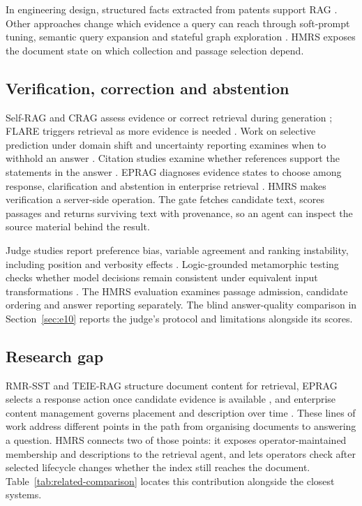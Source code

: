 In engineering design, structured facts extracted from patents support RAG
\citep{siddharth2024retrieval}. Other approaches change which evidence a
query can reach through soft-prompt tuning, semantic query expansion and
stateful graph exploration
\citep{peng2024soft,massai2023evaluatio,tao2025fine}. HMRS exposes the document
state on which collection and passage selection depend.

\subsection{Verification, correction and abstention}

Self-RAG and CRAG assess evidence or correct retrieval during generation
\citep{selfrag,crag}; FLARE triggers retrieval as more evidence is needed
\citep{flare}. Work on selective prediction under domain shift and
uncertainty reporting examines when to withhold an answer
\citep{kamath,feng-abstain,yin-knowwhat}. Citation studies examine whether
references support the statements in the answer
\citep{liu-verifiability,gao-citations}.
EPRAG diagnoses evidence states to choose among response, clarification and
abstention in enterprise retrieval \citep{kinalioglu-kbs-eprag-2026}.
HMRS makes verification a server-side operation. The gate fetches
candidate text, scores passages and returns surviving text with provenance,
so an agent can inspect the source material behind the result.

Judge studies report preference bias, variable agreement and ranking
instability, including position and verbosity effects
\citep{zheng-llmjudge,sun-urara,panickssery-selfpref,wang-llmnotfair}.
Logic-grounded metamorphic testing checks whether model decisions remain
consistent under equivalent input transformations \citep{zhou2026lgmt}.
The HMRS evaluation examines passage admission, candidate ordering and
answer reporting separately. The blind answer-quality comparison in
Section~\ref{sec:e10} reports the judge's protocol and limitations
alongside its scores.

\subsection{Research gap}
\label{sec:gap}

RMR-SST and TEIE-RAG structure document content for retrieval, EPRAG
selects a response action once candidate evidence is available
\citep{li-kbs-rmrsst-2026,shen-kbs-teierag-2026,kinalioglu-kbs-eprag-2026},
and enterprise content management governs placement and description over
time \citep{paivarinta-ecm-2005,park-metadata-quality-2009}. These lines of
work address different points in the path from organising documents to
answering a question. HMRS connects two of those points: it exposes
operator-maintained membership and descriptions to the retrieval agent,
and lets operators check after selected lifecycle changes whether the
index still reaches the document. Table~\ref{tab:related-comparison}
locates this contribution alongside the closest systems.

